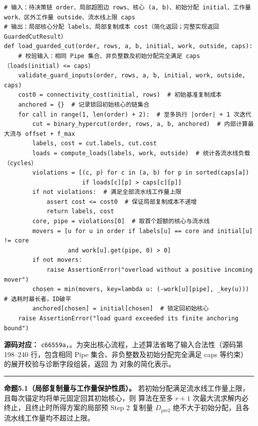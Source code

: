 \documentclass[anonymous,withtoc]{gmcm2026}
\begin{document}
\begin{lstlisting}[style=paperpseudo]
# 输入：待决策链 order、局部超图边 rows、核心 (a, b)、初始分配 initial、工作量 work、区外工作量 outside、流水线上限 caps
# 输出：局部核心分配 labels、局部复制成本 cost（简化返回；完整实现返回 GuardedCutResult）
def load_guarded_cut(order, rows, a, b, initial, work, outside, caps):
    # 校验输入：相同 Pipe 集合、非负整数及初始分配完全满足 caps（loads(initial) <= caps）
    validate_guard_inputs(order, rows, a, b, initial, work, outside, caps)
    cost0 = connectivity_cost(initial, rows)  # 初始基准复制成本
    anchored = {}  # 记录锁回初始核心的链集合
    for call in range(1, len(order) + 2):  # 至多执行 |order| + 1 次迭代
        cut = binary_hypercut(order, rows, a, b, anchored)  # 内部计算最大流与 offset + f_max
        labels, cost = cut.labels, cut.cost
        loads = compute_loads(labels, work, outside)  # 统计各流水线负载（cycles）
        violations = [(c, p) for c in (a, b) for p in sorted(caps[a])
                      if loads[c][p] > caps[c][p]]
        if not violations:  # 满足全部流水线工作量上限
            assert cost <= cost0  # 保证局部复制成本不递增
            return labels, cost
        core, pipe = violations[0]  # 取首个超额的核心与流水线
        movers = [u for u in order if labels[u] == core and initial[u] != core
                  and work[u].get(pipe, 0) > 0]
        if not movers:
            raise AssertionError("overload without a positive incoming mover")
        chosen = min(movers, key=lambda u: (-work[u][pipe], _key(u)))  # 选耗时最长者，ID破平
        anchored[chosen] = initial[chosen]  # 锁定回初始核心
    raise AssertionError("load guard exceeded its finite anchoring bound")
\end{lstlisting}
\textbf{源码对应：} \texttt{c66559a}，\texttt{}。为突出核心流程，上述算法省略了输入合法性（源码第 198--240 行，包含相同 Pipe 集合、非负整数及初始分配完全满足 caps 等约束）的展开校验与诊断字段组装，返回 \texttt{} 为 \texttt{} 对象的简化表示。

\par\hrule\endgroup

\textbf{命题5.1（局部复制量与工作量保护性质）。} 若初始分配满足流水线工作量上限，且每次锚定均将单元固定回其初始核心，则 \texttt{} 算法在至多 \(r + 1\) 次最大流求解内必终止，且终止时所得方案的局部预 Step 2 复制量 \(D_{\mathrm{pre2}}\) 绝不大于初始分配，且各流水线工作量均不超过上限。
\end{document}
